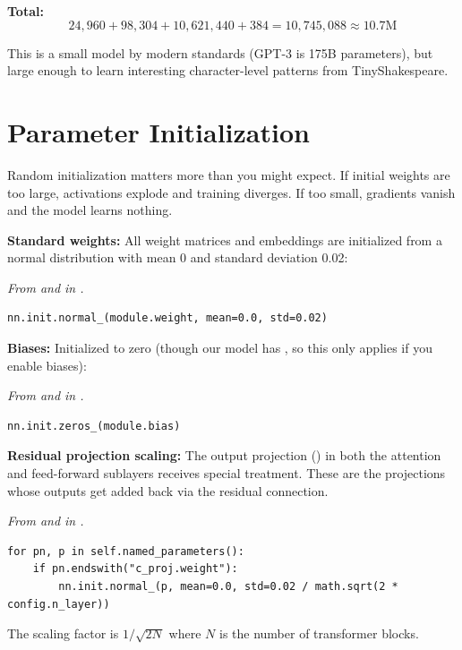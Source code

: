 \textbf{Total:}
\[24{,}960 + 98{,}304 + 10{,}621{,}440 + 384 = 10{,}745{,}088 \approx 10.7\text{M}\]

This is a small model by modern standards (GPT-3 is 175B parameters), but large enough to learn interesting character-level patterns from TinyShakespeare.

\section{Parameter Initialization}

Random initialization matters more than you might expect. If initial weights are too large, activations explode and training diverges. If too small, gradients vanish and the model learns nothing.

\textbf{Standard weights:} All weight matrices and embeddings are initialized from a normal distribution with mean 0 and standard deviation 0.02:

\concepttag
{\small\itshape From  and  in .}
\begin{lstlisting}
nn.init.normal_(module.weight, mean=0.0, std=0.02)
\end{lstlisting}

\textbf{Biases:} Initialized to zero (though our model has , so this only applies if you enable biases):

\concepttag
{\small\itshape From  and  in .}
\begin{lstlisting}
nn.init.zeros_(module.bias)
\end{lstlisting}

\textbf{Residual projection scaling:} The output projection () in both the attention and feed-forward sublayers receives special treatment. These are the projections whose outputs get added back via the residual connection.

\concepttag
{\small\itshape From  and  in .}
\begin{lstlisting}
for pn, p in self.named_parameters():
    if pn.endswith("c_proj.weight"):
        nn.init.normal_(p, mean=0.0, std=0.02 / math.sqrt(2 * config.n_layer))
\end{lstlisting}

The scaling factor is $1 / \sqrt{2N}$ where $N$ is the number of transformer blocks.

